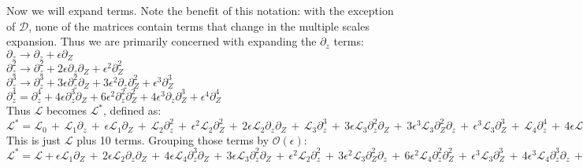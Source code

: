 \documentclass[letterpaper,12pt]{article}
\begin{document}
Now we will expand terms. Note the benefit of this notation: with the exception of $\mathcal{D}$, none of the matrices contain terms that change in the multiple scales expansion. Thus we are primarily concerned with expanding the $\partial_z$ terms: \\

$\partial_z \to \partial_z + \epsilon \partial_Z$ \\

$\partial_z^2 \to \partial_z^2 + 2\epsilon \partial_z \partial_Z + \epsilon^2 \partial_Z^2$ \\

$\partial_z^3 \to \partial_z^3 + 3 \epsilon \partial_z^2 \partial_Z + 3 \epsilon^2 \partial_z \partial_Z^2 + \epsilon^3 \partial_Z^3$ \\

$\partial_z^4 = \partial_z^4 + 4\epsilon \partial_z^3 \partial_Z + 6 \epsilon^2 \partial_z^2 \partial_Z^2 + 4 \epsilon^3 \partial_z \partial_Z^3 + \epsilon^4\partial_Z^4$ \\

Thus $\mathcal{L}$ becomes $\mathcal{L^*}$, defined as: \\

$\mathcal{L^*} = \mathcal{L}_0 \, + \, \mathcal{L}_1\partial_z \,+ \, \epsilon\mathcal{L}_1 \partial_Z \, + \, \mathcal{L}_2\partial_z^2 \, + \, \epsilon^2\mathcal{L}_2\partial_Z^2 \, + \, 2\epsilon\mathcal{L}_2\partial_z\partial_Z \, + \, \mathcal{L}_3\partial_z^3 \, +\, 3\epsilon \mathcal{L}_3 \partial_z^2 \partial_Z \,+\, 3 \epsilon^3\mathcal{L}_3\partial_Z^2\partial_z \,+\, \epsilon^3\mathcal{L}_3\partial_Z^3 \, + \, \mathcal{L}_4\partial_z^4 \, + \, 4 \epsilon \mathcal{L}_4 \partial_z^3 \partial_Z \, + \, 6 \epsilon^2\mathcal{L}_4 \partial_z^2 \partial_Z^2 \, + \, 4 \epsilon^3 \mathcal{L}_4 \partial_Z^3\partial_z \, + \, \epsilon^4\mathcal{L}_4\partial_Z^4$ \\

This is just $\mathcal{L}$ plus 10 terms. Grouping those terms by $\mathcal{O}(\epsilon)$: \\

$\mathcal{L^*} = \mathcal{L} + \epsilon\mathcal{L}_1\partial_Z \, + \, 2\epsilon\mathcal{L}_2\partial_z\partial_Z \, + \, 4 \epsilon\mathcal{L}_4\partial_z^3 \partial_Z \, + \, 3\epsilon\mathcal{L}_3\partial_z^2\partial_Z \, + \, \epsilon^2\mathcal{L}_2\partial_z^2 \, + \, 3\epsilon^2\mathcal{L}_3\partial_Z^2\partial_z \, + \, 6\epsilon^2\mathcal{L}_4 \partial_z^2 \partial_Z^2 \, + \, \epsilon^3\mathcal{L}_3\partial_Z^3 \, + \, 4 \epsilon^3\mathcal{L}_4\partial_z^3 \partial_z \, + \, \epsilon^4\mathcal{L}_4\partial_Z^4 $ \\
\end{document}
